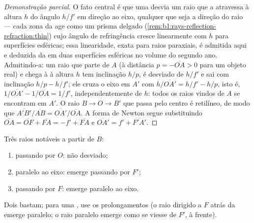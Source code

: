 \begin{proof}[Demonstração parcial]
O fato central é que uma  desvia um raio que a atravessa à altura
$h$ do ângulo $h/f'$ em direção ao eixo, qualquer que seja a direção do raio
--- cada zona da  age como um prisma delgado (\cref{rem:b1:rays-reflection-refraction:thin})
cujo ângulo de refringência cresce linearmente com $h$ para superfícies esféricas; essa
linearidade, exata para raios paraxiais, é admitida aqui e deduzida da
 em duas superfícies esféricas no volume do segundo ano. Admitindo-a:
um raio que parte de $A$ (à distância $p = -\overline{OA} > 0$ para um objeto
real) e chega à  à altura $h$ tem inclinação $h/p$, é
desviado de $h/f'$ e sai com inclinação $h/p - h/f'$; ele cruza o eixo
em $A'$ com $h/\overline{OA'} = h/f' - h/p$, isto é,\ $1/\overline{OA'}
- 1/\overline{OA} = 1/f'$, independentemente de $h$: todos os raios vindos de $A$ se encontram
em $A'$. O raio $B \to O \to B'$ que passa pelo centro é retilíneo, de modo que
$\overline{A'B'}/\overline{AB} = \overline{OA'}/\overline{OA}$. A forma de Newton
segue substituindo $\overline{OA} = \overline{OF} + \overline{FA}
= -f' + \overline{FA}$ e $\overline{OA'} = f' + \overline{F'A'}$.
\end{proof}

\begin{method}\label{met:b1:mirrors-thin-lenses:lensrays}
Três raios notáveis a partir de $B$:
\begin{enumerate}
  \item passando por $O$: não desviado;
  \item paralelo ao eixo: emerge passando por $F'$;
  \item passando por $F$: emerge paralelo ao eixo.
\end{enumerate}
Dois bastam; para uma , use os prolongamentos (o raio dirigido a
$F$ atrás da  emerge paralelo; o raio paralelo emerge como se viesse
de $F'$, à frente).
\end{method}

